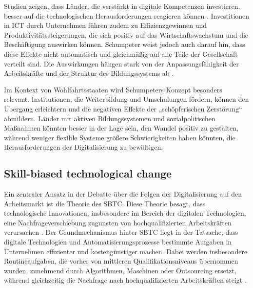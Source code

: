 Studien zeigen, dass Länder, die verstärkt in digitale Kompetenzen investieren, besser auf 
die technologischen Herausforderungen reagieren können 
\parencite[S. 15ff]{oecd2019measuring}. 
Investitionen in \ac{ICT} durch Unternehmen führen zudem zu Effizienzgewinnen und 
Produktivitätssteigerungen, die sich positiv auf das Wirtschaftswachstum und die 
Beschäftigung auswirken können. Schumpeter weist jedoch auch darauf hin, dass diese Effekte 
nicht automatisch und gleichmäßig auf alle Teile der Gesellschaft verteilt sind. Die 
Auswirkungen hängen stark von der Anpassungsfähigkeit der Arbeitskräfte und der Struktur 
des Bildungssystems ab \parencite[S. 48]{oecd2019measuring}.

Im Kontext von Wohlfahrtsstaaten wird Schumpeters Konzept besonders relevant. Institutionen, 
die Weiterbildung und Umschulungen fördern, können den Übergang erleichtern und die 
negativen Effekte der „schöpferischen Zerstörung“ abmildern. Länder mit aktiven 
Bildungssystemen und sozialpolitischen Maßnahmen könnten besser in der Lage sein, den Wandel 
positiv zu gestalten, während weniger flexible Systeme größere Schwierigkeiten haben 
könnten, die Herausforderungen der Digitalisierung zu bewältigen.


\subsection{Skill-biased technological change}

Ein zentraler Ansatz in der Debatte über die Folgen der Digitalisierung auf den Arbeitsmarkt 
ist die Theorie des \ac{SBTC}. Diese Theorie besagt, dass 
technologische Innovationen, insbesondere im Bereich der digitalen Technologien, eine 
Nachfrageverschiebung zugunsten von hochqualifizierten Arbeitskräften verursachen 
\parencite[S. 25f]{acemoglu2002technical}. Der Grundmechanismus hinter \ac{SBTC} liegt in der 
Tatsache, dass digitale Technologien und Automatisierungsprozesse bestimmte Aufgaben in 
Unternehmen effizienter und kostengünstiger machen. Dabei werden insbesondere 
Routineaufgaben, die vorher von mittleren Qualifikationsniveaus übernommen wurden, 
zunehmend durch Algorithmen, Maschinen oder Outsourcing ersetzt, während gleichzeitig die 
Nachfrage nach hochqualifizierten Arbeitskräften steigt 
\parencite[S. 1282]{autor2003theskill}.

